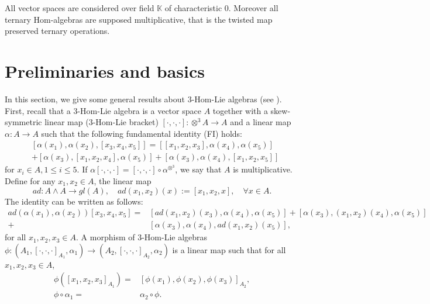 \documentclass[a4paper,11pt]{article}
\def\a{\alpha}
\def\c{\cdot}
\theoremstyle{definition}
\begin{document}
All  vector spaces are considered over field $\mathbb{K}$ of characteristic $0$. Moreover  all ternary Hom-algebras are supposed multiplicative, that is the twisted map preserved ternary operations.

\section{Preliminaries and basics}
\label{sec:bas}


In this section, we give  some general results about $3$-Hom-Lie algebras   (see \cite{Ataguema&Makhlouf&Silvestrov}). First, recall that a {$3$-Hom-Lie algebra}  is a vector space $A$ together with a skew-symmetric linear map ($3$-Hom-Lie bracket) $[\cdot,\cdot,\cdot]:
\otimes^3 A\rightarrow A$ and a linear map $\alpha:A\rightarrow A$ such that the following fundamental identity (FI) holds:
 \begin{equation}\label{eq:de1}
 \begin{split}
&[\alpha(x_1),\alpha(x_2),[x_3,x_4,x_5]]=[[x_1,x_2,x_3],\alpha(x_4),\alpha(x_5)]\\
&+[\alpha(x_3),[x_1,x_2,x_4],\alpha(x_5)]+[\alpha(x_3),\alpha(x_4),[x_1,x_2,x_5]]
\end{split}
\end{equation}
for $x_i\in A, 1\leq i\leq 5$.
If $\a [\c,\c,\c]=[\c,\c,\c]\circ \a^{\otimes^3}$, we say that $A$ is multiplicative.
Define for any $x_1, x_2\in A$,  the linear map
\begin{equation}\label{eq:adjoint}
ad:A\wedge A\to gl(A), \quad ad(x_1,x_2)(x):=[x_1,x_2,x], \quad \forall x\in A.
\end{equation}
The identity \label{eq:de1} can be written as follows:
  \begin{align*}
ad(\alpha(x_1),\alpha(x_2))[x_3,x_4,x_5]=&[ad(x_1,x_2)(x_3),\alpha(x_4),\alpha(x_5)] +[\alpha(x_3),(x_1,x_2)(x_4),\alpha(x_5)] \\
+&[\alpha(x_3),\alpha(x_4),ad(x_1,x_2)(x_5)],
\end{align*}
for  all $x_1, x_2, x_3\in A$. A morphism of $3$-Hom-Lie algebras $\phi:(A_1,[\cdot,\cdot,\cdot]_{A_1},\alpha_1)\rightarrow(A_2,[\cdot,\cdot,\cdot]_{A_2},\alpha_2)$ is a linear map such that for all $x_1,x_2,x_3\in A$,
\begin{align*}
\phi([x_1,x_2,x_3]_{A_1})=&[\phi(x_1),\phi(x_2),\phi(x_3)]_{A_2},\\
\phi\circ\alpha_1=&\alpha_2\circ\phi.
\end{align*}
\end{document}
